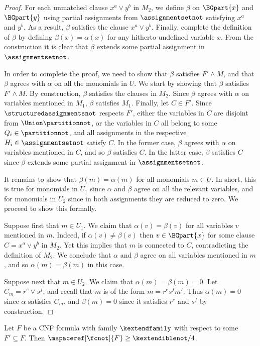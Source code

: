 \begin{proof}
For each unmatched clause $x^a \lor y^b$ in $M_2$, we define $\beta$ on $\BGpart{x}$ and $\BGpart{y}$ using partial assignments from $\assignmentsetnot$ satisfying $x^a$ and $y^b$. As a result, $\beta$ satisfies the clause $x^a \lor y^b$. Finally, complete the definition of $\beta$ by defining $\beta(x) = \alpha(x)$ for any hitherto undefined variable $x$. From the construction it is clear that $\beta$ extends some partial assignment in $\assignmentsetnot$.

In order to complete the proof, we need to show that $\beta$ satisfies $F' \land M$, and that $\beta$ agrees with $\alpha$ on all the monomials in $U$. We start by showing that $\beta$ satisfies $F' \land M$. By construction, $\beta$ satisfies the clauses in $M_2$. Since $\beta$ agrees with $\alpha$ on variables mentioned in $M_1$, $\beta$ satisfies $M_1$. Finally, let $C \in F'$. Since $\structuredassignmentsnot$ respects $F'$, either the variables in $C$ are disjoint from $\Union \partitionnot$, or the variables in $C$ all belong to some $Q_i \in \partitionnot$, and all assignments in the respective $H_i \in \assignmentsetnot$ satisfy $C$. In the former case, $\beta$ agrees with $\alpha$ on variables mentioned in $C$, and so $\beta$ satisfies $C$. In the latter case, $\beta$ satisfies $C$ since $\beta$ extends some partial assignment in $\assignmentsetnot$.

It remains to show that $\beta(m) = \alpha(m)$ for all monomials $m \in U$. In short, this is true for monomials in $U_1$ since $\alpha$ and $\beta$ agree on all the relevant variables, and for monomials in $U_2$ since in both assignments they are reduced to zero. We proceed to show this formally.

Suppose first that $m \in U_1$. We claim that $\alpha(v) = \beta(v)$ for all variables $v$ mentioned in $m$. Indeed, if $\alpha(v) \neq \beta(v)$ then $v \in \BGpart{x}$ for some clause $C = x^a \lor y^b$ in $M_2$. Yet this implies that $m$ is connected to $C$, contradicting the definition of $M_2$. We conclude that $\alpha$ and $\beta$ agree on all variables mentioned in $m$, and so $\alpha(m) = \beta(m)$ in this case.

Suppose next that $m \in U_2$. 
We claim that $\alpha(m) = \beta(m) = 0$. Let $C_m = r^e \lor s^f$,
and recall that $m$ is of the form $m = r^e s^f m'$. 
Thus $\alpha(m) = 0$ since $\alpha$ satisfies $C_m$, and $\beta(m) =0$ 
since it satisfies $r^e$ and $s^f$ by construction.
\end{proof}

\begin{theorem}
  Let $F$ be a CNF formula with \akextendible family $\kextendfamily$
  with respect to some $F'\subseteq F$. Then
  $\mspaceref[\fcnot]{F}\geq \kextendiblenot/4$.
\end{theorem}

